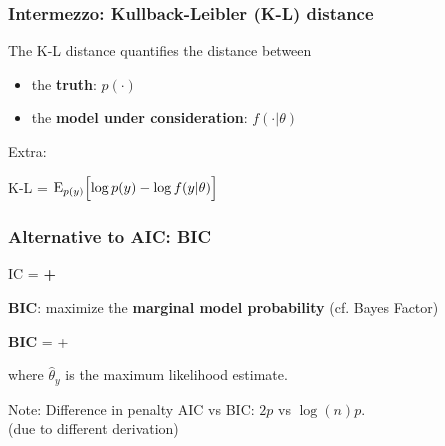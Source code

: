 \documentclass[10pt]{beamer}\usepackage[]{graphicx}\usepackage[]{xcolor}
\begin{document}
%
\begin{frame}
	\frametitle{Intermezzo: Kullback-Leibler (K-L) distance}

		The K-L distance quantifies the distance between
		\begin{itemize}
			\item the \textbf{truth}: $p(\cdot)$
			\item the \textbf{model under consideration}: $f(\cdot|\theta)$\\
		\end{itemize}
		
		\vspace{.5 cm}
		
		Extra:\\
		\centerline{ K-L = {$\mathrm{E}_{p(y)}\Bigl[\log p(y) -
		\log f(y|\theta)\Bigr]$}}
    \bigskip
			
				
\end{frame}
%
\begin{frame}
	\frametitle{Alternative to AIC: BIC}
	
	\centerline{	IC = \textbf{{\color{orange}{model misfit}} + {\color{purple}{model complexity}}}}
	
	\vspace{1 cm}
	{\textbf{BIC}:
		maximize the \textbf{marginal model probability} (cf. Bayes Factor)}
	
	\vspace{.5 cm}
	\centerline{{\textbf{BIC} ={} + \color{purple}{$\log(n) p $}}}
	
	\vspace{.5 cm}
	where $\hat{\theta}_y$ is the maximum likelihood estimate.
	
	\vspace{.5 cm}
	\begin{block}{Note:}
		Difference in penalty AIC vs BIC: $2 p$ vs $\log(n) p$.\\
		(due to different derivation)
	\end{block}
	 
\end{frame}
\end{document}
